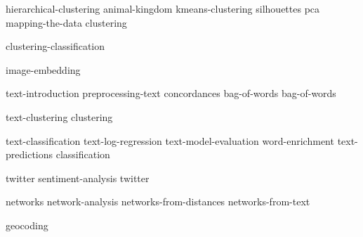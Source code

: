\documentclass[symmetric, justified, a4paper]{tufte-book}
\begin{document}

{hierarchical-clustering}
{animal-kingdom}
{kmeans-clustering}
{silhouettes}
{pca}
{mapping-the-data}
{clustering}

{clustering-classification}

{image-embedding}


{text-introduction}
{preprocessing-text}
{concordances}
{bag-of-words}
{bag-of-words}

{text-clustering}
{clustering}

{text-classification}
{text-log-regression}
{text-model-evaluation}
{word-enrichment}
{text-predictions}
{classification}

{twitter}
{sentiment-analysis}
{twitter}


{networks}
{network-analysis}
{networks-from-distances}
{networks-from-text}


{geocoding}

\backmatter
\nocite{*}





\printindex
\end{document}
